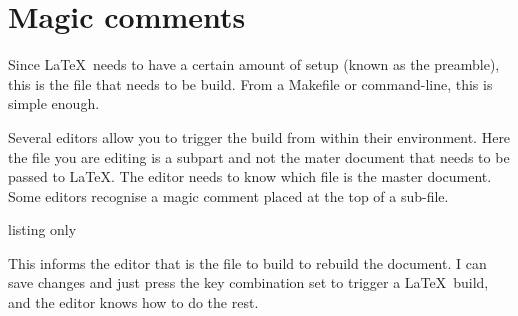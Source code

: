 \section{Magic comments}
Since \LaTeX\ needs to have a certain amount of setup (known as the preamble), this is the file that needs to be build.  From a Makefile or command-line, this is simple enough.

Several editors allow you to trigger the build from within their environment.  Here the file you are editing is a subpart and not the mater document that needs to be passed to \LaTeX.   The editor needs to know which  file is the master document.  Some editors recognise a magic comment placed at the top of a sub-file.
\begin{tcblisting}{listing only}
\end{tcblisting}
This informs the editor that  is the file to build to rebuild the document.  I can save changes and just press the key combination set to trigger a \LaTeX\ build, and the editor knows how to do the rest.
